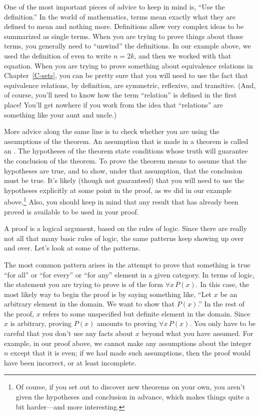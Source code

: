 One of the most important pieces of advice to keep in mind is,
``Use the definition.''  In the world of mathematics, terms
mean exactly what they are defined to mean and nothing more.
Definitions allow very complex ideas to be summarized as
single terms.  When you are trying to prove things about
those terms, you generally need to ``unwind'' the definitions.
In our example above, we used the definition of
even to write $n=2k$, and then we worked with that equation.
When you are trying to prove something about equivalence relations
in Chapter~\ref{C-sets},
you can be pretty sure that you will need to use the
fact that equivalence relations, by definition, are symmetric, reflexive,
and transitive.  (And, of course,
you'll need to know how the term ``relation'' is defined
in the first place!
You'll get nowhere if you work from the idea that ``relations'' are something
like your aunt and uncle.)

More advice along the same line is to check whether you are
using the assumptions of the theorem.  An assumption that
is made in a theorem is called an .  The hypotheses
of the theorem state conditions whose truth will guarantee the
conclusion of the theorem.  To prove the theorem means to assume
that the hypotheses are true, and to show, under that assumption,
that the conclusion must be true.  It's likely (though not
guaranteed) that you will need to use the hypotheses explicitly 
at some point in the proof, as we did in our example above.\footnote{Of 
course, if you set out to
discover new theorems on your own, you aren't given the hypotheses
and conclusion in advance, which makes things quite a bit harder---and
more interesting.}  Also, you should keep in mind that any
result that has already been proved is available to be used
in your proof.

\medbreak

A proof is a logical argument, based on the rules of logic.
Since there are really not all that many basic rules of logic,
the same patterns keep showing up over and over.  Let's look
at some of the patterns.

The most common pattern arises in the attempt to prove that
something is true ``for all'' or ``for every'' or ``for any''
element in a given category.  In terms of logic, the statement
you are trying to prove is of the form $\forall x\,P(x)$.
In this case, the most likely way to begin the proof is
by saying something like, ``Let $x$ be an arbitrary element in 
the domain.  We want to show that $P(x)$.''  In the
rest of the proof, $x$ refers to some unspecified but definite
element in the domain.  Since $x$ is arbitrary,
proving $P(x)$ amounts to proving $\forall x\,P(x)$.  You only
have to be careful that you don't use any facts about $x$ beyond
what you have assumed.  For example, in our proof above, we cannot
make any assumptions about the integer $n$ except that it is
even; if we had made such assumptions, then the proof would have
been incorrect, or at least incomplete.

